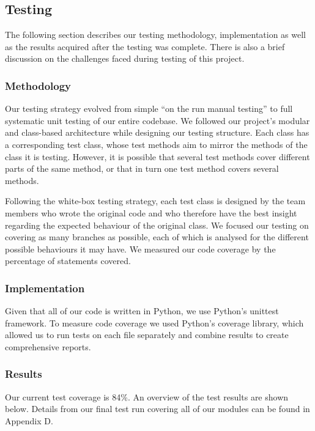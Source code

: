 \documentclass[a4paper,11pt]{article}
\begin{document}
\subsection{Testing}
The following section describes our testing methodology, implementation as well as the results acquired after the testing was complete. There is also a brief discussion on the challenges faced during testing of this project.

\subsubsection{Methodology}
Our testing strategy evolved from simple ``on the run manual testing'' to full systematic unit testing of our entire codebase. We followed our project's modular and class-based architecture while designing our testing structure. Each class has a corresponding test class, whose test methods aim to mirror the methods of the class it is testing. However, it is possible that several test methods cover different parts of the same method, or that in turn one test method covers several methods.

Following the white-box testing strategy, each test class is designed by the team members who wrote the original code and who therefore have the best insight regarding the expected behaviour of the original class. We focused our testing on covering as many branches as possible, each of which is analysed for the different possible behaviours it may have. We measured our code coverage by the percentage of statements covered.

\subsubsection{Implementation}
Given that all of our code is written in Python, we use Python's unittest framework. To measure code coverage we used Python's coverage library, which allowed us to run tests on each file separately and combine results to create comprehensive reports.

\subsubsection{Results}
Our current test coverage is 84\%. An overview of the test results are shown below. Details from our final test run covering all of our modules can be found in Appendix D.
\end{document}
